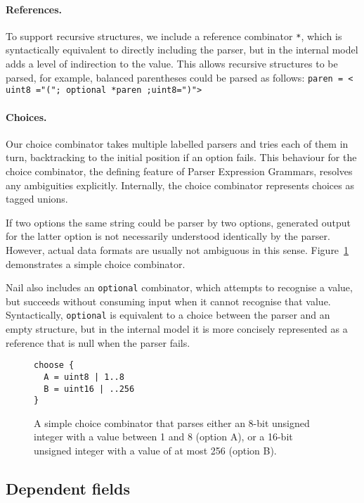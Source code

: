 \paragraph{References.}
To support recursive structures, we include a reference combinator \texttt{*}, which is
syntactically equivalent to directly including the parser, but in the internal model adds a level of
indirection to the value. This allows recursive structures to be parsed, for example, balanced
parentheses could be parsed as follows: \texttt{paren = < uint8 ="("; optional *paren ;uint8=")">}

\paragraph{Choices.}
Our choice combinator takes multiple labelled parsers and tries each of them in turn, backtracking
to the initial position if an option fails. This behaviour for the choice combinator, the defining
feature of Parser Expression Grammars\cite{ford2002packrat}, resolves any ambiguities explicitly.
Internally, the choice combinator represents choices as tagged unions. 

If two options the same string could be parser by two options, generated output for the latter
option is not necessarily understood identically by the parser. However, actual data formats are
usually not ambiguous in this sense. Figure~\ref{fig:choice} demonstrates a simple choice
combinator.

Nail also includes an \texttt{optional} combinator, which attempts to recognise a value, but succeeds
without consuming input when it cannot recognise that value. Syntactically, \texttt{optional} is
equivalent to a choice between the parser and an empty structure, but in the internal model it is
more concisely represented as a reference that is null when the parser fails.

\begin{figure}[tb]
\begin{verbatim}
choose {
  A = uint8 | 1..8
  B = uint16 | ..256
}
\end{verbatim}
\caption{A simple choice combinator that parses either an 8-bit unsigned
integer with a value between 1 and 8 (option A), or a 16-bit unsigned
integer with a value of at most 256 (option B).}
\label{fig:choice}
\end{figure}




\subsection{Dependent fields}


